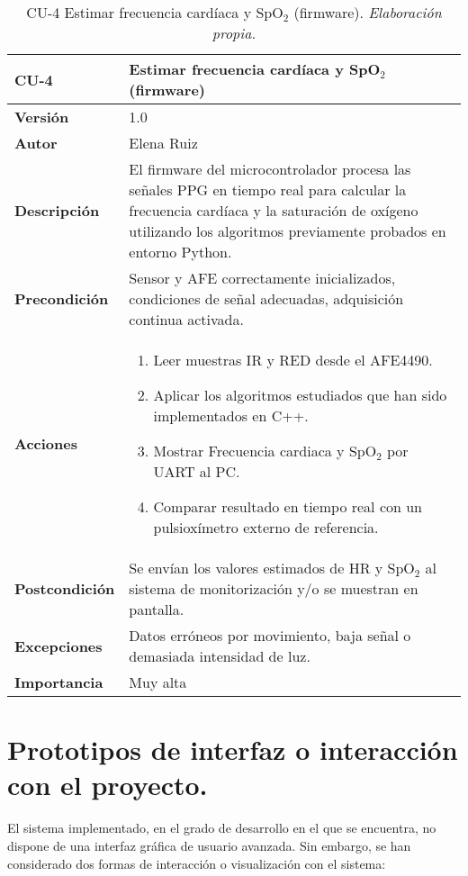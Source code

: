 \begin{table}[H]
	\centering
	\begin{tabularx}{\linewidth}{ p{} p{} }
		\toprule
		\textbf{CU-4}    & \textbf{Estimar frecuencia cardíaca y SpO$_2$ (firmware)} \\
		\toprule
		\textbf{Versión}              & 1.0 \\
		\textbf{Autor}                & Elena Ruiz \\
		\textbf{Descripción}          & El firmware del microcontrolador procesa las señales PPG en tiempo real para calcular la frecuencia cardíaca y la saturación de oxígeno utilizando los algoritmos previamente probados en entorno Python. \\
		\textbf{Precondición}         & Sensor y AFE correctamente inicializados, condiciones de señal adecuadas, adquisición continua activada. \\
		\textbf{Acciones}             &
		\begin{enumerate}
			\item Leer muestras IR y RED desde el AFE4490.
			\item Aplicar los algoritmos estudiados que han sido implementados en C++.
			\item Mostrar Frecuencia cardiaca y SpO$_2$ por UART al PC.
            \item Comparar resultado en tiempo real con un pulsioxímetro externo de referencia.
		\end{enumerate} \\
		\textbf{Postcondición}        & Se envían los valores estimados de HR y SpO$_2$ al sistema de monitorización y/o se muestran en pantalla. \\
		\textbf{Excepciones}          & Datos erróneos por movimiento, baja señal o demasiada intensidad de luz.\\
		\textbf{Importancia}          & Muy alta \\
		\bottomrule
	\end{tabularx}
	\caption{CU-4 Estimar frecuencia cardíaca y SpO$_2$ (firmware). \textit{Elaboración propia.}}
\end{table}


\section{Prototipos de interfaz o interacción con el proyecto.}

El sistema implementado, en el grado de desarrollo en el que se encuentra, no dispone de una interfaz gráfica de usuario avanzada. Sin embargo, se han considerado dos formas de interacción o visualización con el sistema:

